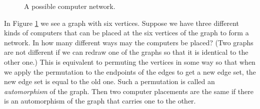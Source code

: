\begin{figure}[htb]\caption{A possible
computer network.}\label{HexNet}\smallskip
\begin{center}\mbox{}
\end{center}  
\end{figure} 

\itemi In Figure \ref{HexNet} we see a graph with six vertices.  Suppose we
have three different kinds of computers that can be placed at the six vertices
of the graph to form a network.  In how many different ways may the computers
be placed? (Two graphs are not different if we
can redraw one of the graphs so that it is identical to
the other one.)  This is equivalent to permuting the vertices in some way so that when we
apply the permutation to the endpoints of the edges to get a new edge set, the new edge
set is equal to the old one.  Such a permutation is called an {\em
automorphism} of the graph.  Then two computer
placements are the same if there is an automorphism of the graph that carries one to the
other.  
